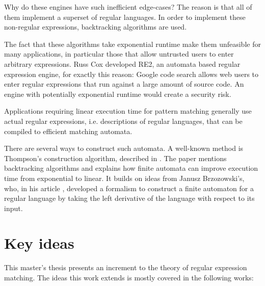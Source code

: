 Why do these engines have such inefficient edge-cases? The reason is that all of
them implement a superset of regular languages. In order to implement these
non-regular expressions, backtracking algorithms are used.

The fact that these algorithms take exponential runtime make them unfeasible for
many applications, in particular those that allow untrusted users to enter
arbitrary expressions. Russ Cox developed RE2, an automata based regular
expression engine, for exactly this reason: Google code search allows web users
to enter regular expressions that run against a large amount of source code. An
engine with potentially exponential runtime would create a security risk.

Applications requiring linear execution time for pattern matching generally use
actual regular expressions, i.e. descriptions of regular languages, that can be
compiled to efficient matching automata.

There are several ways to construct such automata. A well-known method is
Thompson's construction algorithm, described in \cite{thompson}. The paper
mentions backtracking algorithms and explains how finite automata can improve
execution time from exponential to linear. It builds on ideas from Janusz
Brzozowski's, who, in his article \cite{brzozowski}, developed a formalism to
construct a finite automaton for a regular language by taking the left
derivative of the language with respect to its input.


\section{Key ideas}

This master's thesis presents an increment to the theory of regular expression
matching. The ideas this work extends is mostly covered in the following works:

